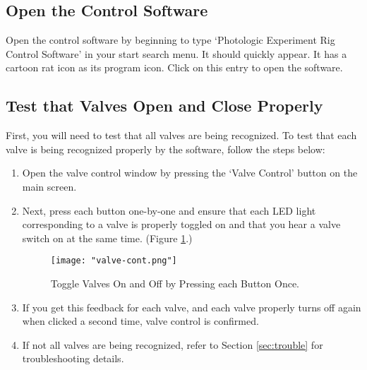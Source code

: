 \documentclass{article}
\begin{document}
\subsection{Open the Control Software}
Open the control software by beginning to type `Photologic Experiment Rig Control Software' in your start search menu. 
It should quickly appear. It has a cartoon rat icon as its program icon. Click on this entry to open the software.
\subsection{Test that Valves Open and Close Properly}
First, you will need to test that all valves are being recognized. To test that each valve is being recognized properly by the software, follow the steps below:
\begin{enumerate}
    \item Open the valve control window by pressing the `Valve Control' button on the main screen. 
    \item Next, press each button one-by-one and ensure that each LED light corresponding to a valve is properly toggled on and that you hear a 
        valve switch on at the same time. (Figure \ref{fig:valve-cont-wind}.)
        \begin{figure}[h!]
            \centering
            \texttt{[image: "valve-cont.png"]}
            \caption{Toggle Valves On and Off by Pressing each Button Once.}
            \label{fig:valve-cont-wind}
        \end{figure}
        \FloatBarrier

    \item If you get this feedback for each valve, and each valve properly turns off again when clicked a second time, valve control is confirmed. 
    \item If not all valves are being recognized, refer to Section \ref{sec:trouble} for troubleshooting details.
\end{enumerate}
\end{document}
